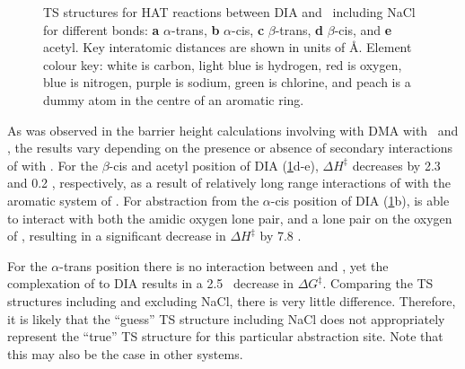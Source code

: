 \begin{doublespace}
\begin{figure}\ContinuedFloat
  \setcounter{subfigure}{4}

  \caption[TS structures for HAT reaction between DIA and \cumo\ including
  NaCl.]{TS structures for HAT reactions between DIA and \cumo\ including NaCl
  for different  bonds: \textbf{a} $\alpha$-trans, \textbf{b}
  $\alpha$-cis, \textbf{c} $\beta$-trans, \textbf{d} $\beta$-cis, and
  \textbf{e} acetyl. Key interatomic distances are shown in units of \AA.
  Element colour key: white is carbon, light blue is hydrogen, red is oxygen,
  blue is nitrogen, purple is sodium, green is chlorine, and peach is a dummy
  atom in the centre of an aromatic ring.}
  \label{fig:dia-cumo-ts}
\end{figure}

As was observed in the barrier height calculations involving  with DMA
with \bno\ and \cumo, the results vary depending on the presence or absence of
secondary interactions of  with \cumo. For the $\beta$-cis and acetyl
position of DIA (\ref{fig:dia-cumo-ts}d-e), $\Delta H^\ddagger$ decreases by 2.3
and 0.2 \kcalmol, respectively, as a result of relatively long range
interactions of  with the aromatic system of \cumo. For abstraction from
the $\alpha$-cis position of DIA (\ref{fig:dia-cumo-ts}b),  is able to
interact with both the amidic oxygen lone pair, and a lone pair on the oxygen of
\cumo, resulting in a significant decrease in $\Delta H^\ddagger$ by 7.8
\kcalmol.

For the $\alpha$-trans position there is no interaction between  and
\cumo, yet the complexation of  to DIA results in a 2.5 \kcalmol\
decrease in $\Delta G^\ddagger$. Comparing the TS structures including and
excluding NaCl, there is very little difference. Therefore, it is likely that
the ``guess'' TS structure including NaCl does not appropriately represent the
``true'' TS structure for this particular abstraction site. Note that this may
also be the case in other systems.


\end{doublespace}
